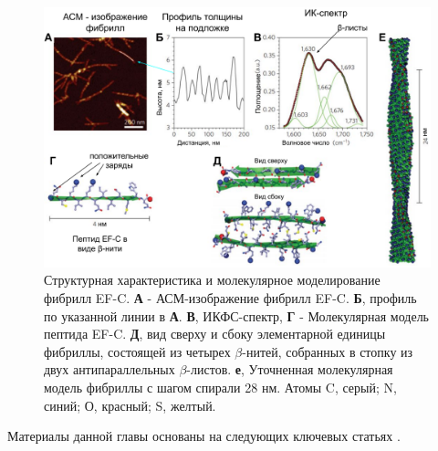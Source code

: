    

\begin{figure} [H]
    \centering
    \includegraphics[width=\textwidth]{images/p4/natnanotech2013/nn2013/nn2013_f2.pdf}
    \caption[Структурная характеристика и молекулярное моделирование фибрилл EF-C]{Структурная характеристика и молекулярное моделирование фибрилл EF-C. \textbf{А} - АСМ-изображение фибрилл EF-C. \textbf{Б}, профиль по указанной линии в \textbf{А}. \textbf{В}, ИКФС-спектр, \textbf{Г} - Молекулярная модель пептида EF-C. \textbf{Д}, вид  сверху и сбоку элементарной единицы фибриллы, состоящей из четырех $\beta$-нитей, собранных в стопку из двух антипараллельных $\beta$-листов. \textbf{е}, Уточненная молекулярная модель фибриллы с шагом спирали 28 нм. Атомы C, серый; N, синий; О, красный; S, желтый.}
    \label{fig:p4_nn2013_f2}
\end{figure}


Материалы данной главы основаны на следующих ключевых статьях \cite{shaytan_self-assembling_2011,shaytan_self-organizing_2011,yolamanova_peptide_2013}. 


